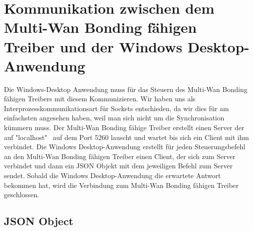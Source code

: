 \section{Kommunikation zwischen dem Multi-Wan Bonding fähigen Treiber und der Windows Desktop-Anwendung}
Die Windows-Desktop Anwendung muss für das Steuern des Multi-Wan Bonding fähigen Treibers mit diesem Kommunizieren. Wir haben uns als Interprozesskommunikationsart für Sockets entschieden, da wir dies für am einfachsten angesehen haben, weil man sich nicht um die Synchronisation kümmern muss. Der Multi-Wan Bonding fähige Treiber erstellt einen Server der auf "localhost" \ auf dem Port 5260 lauscht und wartet bis sich ein Client mit ihm verbindet. Die Windows Desktop-Anwendung erstellt für jeden Steuerungsbefehl an den Multi-Wan Bonding fähigen Treiber einen Client, der sich zum Server verbindet und dann ein JSON Objekt mit dem jeweiligen Befehl zum Server sendet. Sobald die Windows Desktop-Anwendung die erwartete Antwort bekommen hat, wird die Verbindung zum Multi-Wan Bonding fähigen Treiber geschlossen.

\newpage
\subsection{JSON Object}
